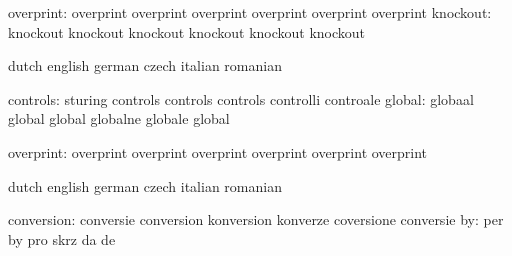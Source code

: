                 overprint: overprint                 overprint
                           overprint                 overprint
                           overprint                 overprint %
                 knockout: knockout                  knockout
                           knockout                  knockout
                           knockout                  knockout %

\stopvariables

\startconstants            dutch                     english
                           german                    czech
                           italian                   romanian

                 controls: sturing                   controls
                           controls                  controls
                           controlli                 controale
                   global: globaal                   global
                           global                    globalne
                           globale                   global

                overprint: overprint                 overprint
                           overprint                 overprint
                           overprint                 overprint %


\stopconstants





\startvariables            dutch                     english
                           german                    czech
                           italian                   romanian

               conversion: conversie                 conversion
                           konversion                konverze
                           coversione                conversie
                       by: per                       by
                           pro                       skrz
                           da                        de

\stopvariables



